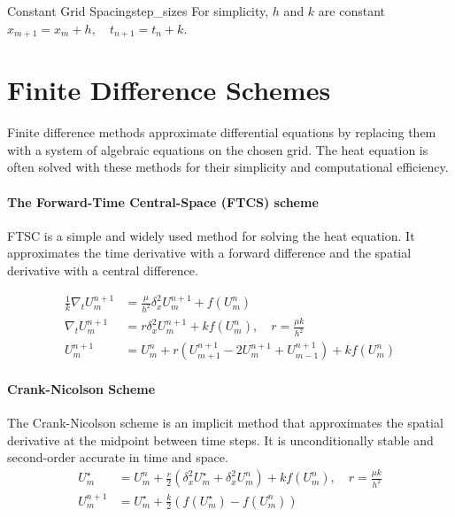 \begin{remark}{Constant Grid Spacing}{step_sizes}
  For simplicity, \(h\) and \(k\) are constant \( x_{m+1} = x_m + h,\quad t_{n+1} = t_n + k \).
\end{remark}

\section{Finite Difference Schemes}

Finite difference methods approximate differential equations by replacing them with a system of algebraic equations on the chosen grid.
The heat equation is often solved with these methods for their simplicity and computational efficiency.

\paragraph{The Forward-Time Central-Space (FTCS) scheme}

FTSC is a simple and widely used method for solving the heat equation.
It approximates the time derivative with a forward difference and the spatial derivative with a central difference.


\begin{align*}
  \frac{1}{k} \nabla_t U_m^{n+1} & = \frac{\mu}{h^2} \delta_x^2 U_m^{n+1} + f(U_m^n)                                              \\
  \nabla_t U_m^{n+1}             & = r \delta_x^2 U_m^{n+1} + k f(U_m^n), \quad r = \frac{\mu k}{h^2}                             \\
  U_m^{n+1}                      & = U_m^n + r \left( U_{m+1}^{n+1} - 2 U_m^{n+1} + U_{m-1}^{n+1} \right) + k f(U_m^n) \tag{FTCS}
\end{align*}

\paragraph{Crank-Nicolson Scheme}

The Crank-Nicolson scheme is an implicit method that approximates the spatial derivative at the midpoint between time steps. It is unconditionally stable and second-order accurate in time and space.
\begin{align*}
  U_m^\star & = U_m^n + \frac{r}{2} \left( \delta_x^2 U_m^\star + \delta_x^2 U_m^n \right) + k f(U_m^n), \quad r = \frac{\mu k}{h^2} \\
  U_m^{n+1} & = U_m^\star + \frac{k}{2} \left( f(U_m^\star) - f(U_m^n) \right) \tag{Crank-Nicolson}
\end{align*}

